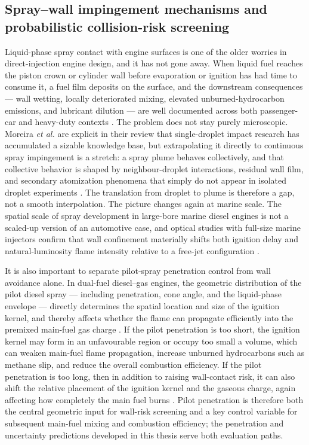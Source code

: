 \documentclass[english, 12pt, a4paper, elec, utf8, a-2b, online]{aaltothesis}
\begin{document}
\subsection{Spray--wall impingement mechanisms and probabilistic collision-risk screening}

Liquid-phase spray contact with engine surfaces is one of the older worries in direct-injection engine design, and it has not gone away. 
When liquid fuel reaches the piston crown or cylinder wall before evaporation or ignition has had time to consume it, 
a fuel film deposits on the surface, and the downstream consequences 
--- wall wetting, locally deteriorated mixing, elevated unburned-hydrocarbon emissions, and lubricant dilution 
--- are well documented across both passenger-car and heavy-duty contexts \cite{peraza2022swi,ahmad2025fueldilution,MorieiraMotaPanao2010}. 
The problem does not stay purely microscopic. 
Moreira \textit{et al.} are explicit in their review that single-droplet impact research has accumulated a sizable knowledge base, 
but extrapolating it directly to continuous spray impingement is a stretch: 
a spray plume behaves collectively, and that collective behavior is shaped by neighbour-droplet interactions, residual wall film, 
and secondary atomization phenomena that simply do not appear in isolated droplet experiments \cite{MorieiraMotaPanao2010}. 
The translation from droplet to plume is therefore a gap, not a smooth interpolation. 
The picture changes again at marine scale. 
The spatial scale of spray development in large-bore marine diesel engines is not a scaled-up version of an automotive case, 
and optical studies with full-size marine injectors confirm that wall confinement materially shifts both ignition delay and natural-luminosity 
flame intensity relative to a free-jet configuration \cite{liu2024marine_impingement}.

It is also important to separate pilot-spray penetration control from wall avoidance alone. 
In dual-fuel diesel--gas engines, the geometric distribution of the pilot diesel spray 
--- including penetration, cone angle, and the liquid-phase envelope --- 
directly determines the spatial location and size of the ignition kernel, 
and thereby affects whether the flame can propagate efficiently into the premixed main-fuel gas charge 
\cite{Karim2015DualFuel,WeiGeng2016DualFuelReview,Sahoo2009DualFuelReview}. 
If the pilot penetration is too short, the ignition kernel may form in an unfavourable region or occupy too small a volume, 
which can weaken main-fuel flame propagation, increase unburned hydrocarbons such as methane slip, 
and reduce the overall combustion efficiency. 
If the pilot penetration is too long, then in addition to raising wall-contact risk, 
it can also shift the relative placement of the ignition kernel and the gaseous charge, 
again affecting how completely the main fuel burns \cite{WeiGeng2016DualFuelReview,Sahoo2009DualFuelReview}. 
Pilot penetration is therefore both the central geometric input for wall-risk screening 
and a key control variable for subsequent main-fuel mixing and combustion efficiency; 
the penetration and uncertainty predictions developed in this thesis serve both evaluation paths.
\end{document}
